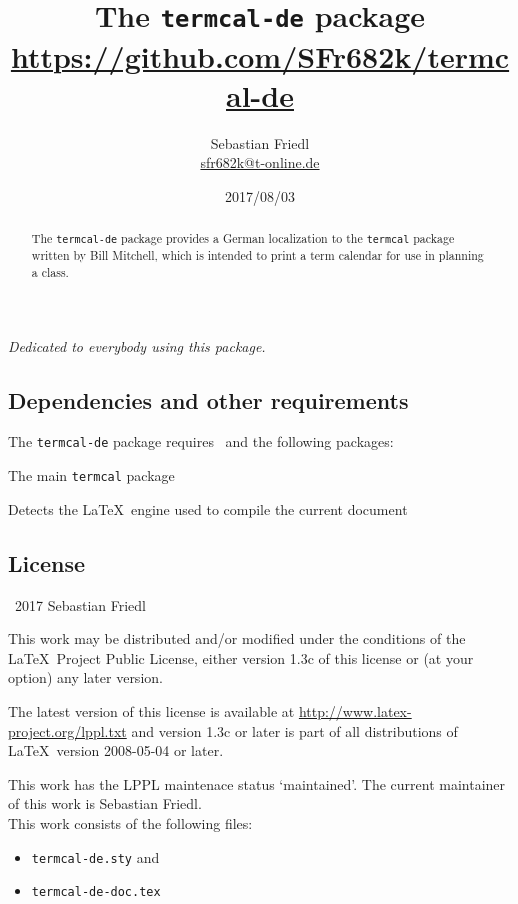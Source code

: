\documentclass[11pt]{ltxdoc}
\title{The \texttt{termcal-de} package \\ {\large\url{https://github.com/SFr682k/termcal-de}}}
\author{Sebastian Friedl \\ \href{mailto:sfr682k@t-online.de}{\ttfamily sfr682k@t-online.de}}
\date{2017/08/03}
\begin{document}
	\maketitle
	\thispagestyle{empty}
	
	\begin{center} \itshape
		Dedicated to everybody using this package.
	\end{center}
	
	\medskip
	\begin{abstract}
		\hspace{-1.5em}%
		The \texttt{termcal-de} package provides a German localization to the \texttt{termcal} package written by Bill Mitchell, which is intended to print a term calendar for use in planning a class.
	\end{abstract}
	
	
	\tableofcontents
	
	\clearpage
	
	
	\subsection*{Dependencies and other requirements}
	The \texttt{termcal-de} package requires \LaTeXe\ and the following packages:
	
	\medskip
	The main \texttt{termcal} package
	
	\medskip
	Detects the \LaTeX\ engine used to compile the current document
	
	
	\subsection*{License}
	\begin{small}
		\textcopyright\ 2017 Sebastian Friedl
		
		\smallskip
		This work may be distributed and/or modified under the conditions of the \LaTeX\ Project Public License, either version 1.3c of this license or (at your option) any later version.
		
		\smallskip
		The latest version of this license is available at \url{http://www.latex-project.org/lppl.txt} and version 1.3c or later is part of all distributions of \LaTeX\ version 2008-05-04 or later.
		
		\smallskip
		This work has the LPPL maintenace status \enquote*{maintained}. The current maintainer of this work is Sebastian Friedl. \\
		This work consists of the following files:
		\begin{itemize} \itemsep 0pt
			\item \texttt{termcal-de.sty} and
			\item \texttt{termcal-de-doc.tex}
		\end{itemize}
	\end{small}
\end{document}
